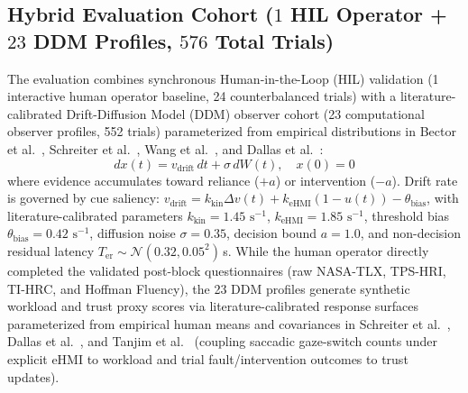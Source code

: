 \documentclass[conference]{IEEEtran}
\begin{document}
\subsection{Hybrid Evaluation Cohort ($1$ HIL Operator + $23$ DDM Profiles, $576$ Total Trials)}
The evaluation combines synchronous Human-in-the-Loop (HIL) validation (1 interactive human operator baseline, 24 counterbalanced trials) with a literature-calibrated Drift-Diffusion Model (DDM) observer cohort (23 computational observer profiles, 552 trials) parameterized from empirical distributions in Bector et al.~\cite{bector2026anatomy}, Schreiter et al.~\cite{schreiter2026legible}, Wang et al.~\cite{wang2025effects}, and Dallas et al.~\cite{dallas2026examining}:
\begin{equation}
dx(t) = v_{\text{drift}} \, dt + \sigma \, dW(t), \quad x(0) = 0
\end{equation}
where evidence accumulates toward reliance ($+a$) or intervention ($-a$). Drift rate is governed by cue saliency: $v_{\text{drift}} = k_{\text{kin}} \Delta v(t) + k_{\text{eHMI}} (1 - u(t)) - \theta_{\text{bias}}$, with literature-calibrated parameters $k_{\text{kin}} = 1.45\text{ s}^{-1}$, $k_{\text{eHMI}} = 1.85\text{ s}^{-1}$, threshold bias $\theta_{\text{bias}} = 0.42\text{ s}^{-1}$, diffusion noise $\sigma = 0.35$, decision bound $a = 1.0$, and non-decision residual latency $T_{\text{er}} \sim \mathcal{N}(0.32, 0.05^2)$\,s. While the human operator directly completed the validated post-block questionnaires (raw NASA-TLX, TPS-HRI, TI-HRC, and Hoffman Fluency), the 23 DDM profiles generate synthetic workload and trust proxy scores via literature-calibrated response surfaces parameterized from empirical human means and covariances in Schreiter et al.~\cite{schreiter2026legible}, Dallas et al.~\cite{dallas2026examining}, and Tanjim et al.~\cite{tanjim2025field,tanjim2025action} (coupling saccadic gaze-switch counts under explicit eHMI to workload and trial fault/intervention outcomes to trust updates).
\end{document}
